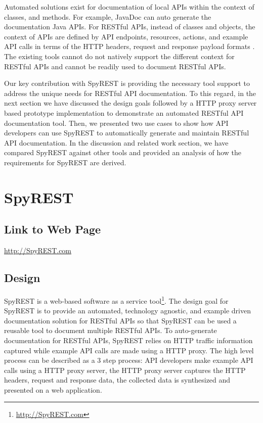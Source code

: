 \documentclass[conference]{IEEEtran}
\begin{document}
Automated solutions exist for documentation of local APIs within the context of classes, and methods. For example, JavaDoc can auto generate the documentation Java APIs. For RESTful APIs, instead of classes and objects, the context of APIs are defined by API endpoints, resources, actions, and example API calls in terms of the HTTP headers, request and response payload formats \cite{Danielsen_validation}. The existing tools cannot do not natively support the different context for RESTful APIs and cannot be readily used to document RESTful APIs.

Our key contribution with SpyREST is providing the necessary tool support to address the unique needs for RESTful API documentation. To this regard, in the next section we have discussed the design goals followed by a HTTP proxy server based prototype implementation to demonstrate an automated RESTful API documentation tool. Then, we presented two use cases to show how API developers can use SpyREST to automatically generate and maintain RESTful API documentation. In the discussion and related work section, we have compared SpyREST against other tools and provided an analysis of how the requirements for SpyREST are derived.

\section{SpyREST}

\subsection{Link to Web Page}
\url{http://SpyREST.com}

\subsection{Design} %
\label{sub:how_it_works}

SpyREST is a web-based software as a service tool\footnote{\url{http://SpyREST.com}}. The design goal for SpyREST is to provide an automated, technology agnostic, and example driven documentation solution for RESTful APIs so that SpyREST can be used a reusable tool to document multiple RESTful APIs. To auto-generate documentation for RESTful APIs, SpyREST relies on HTTP traffic information captured while example API calls are made using a HTTP proxy. The high level process can be described as a 3 step process: API developers make example API calls using a HTTP proxy server, the HTTP proxy server captures the HTTP headers, request and response data, the collected data is synthesized and presented on a web application.
\end{document}
